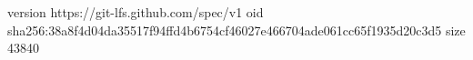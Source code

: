 version https://git-lfs.github.com/spec/v1
oid sha256:38a8f4d04da35517f94ffd4b6754cf46027e466704ade061cc65f1935d20c3d5
size 43840
